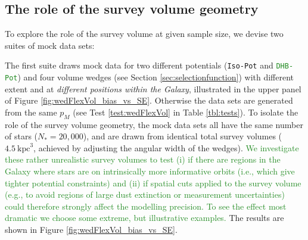 \documentclass[iop,revtex4]{emulateapj}
\newcommand{\pmodel}{\ensuremath{p_M}}
\newcommand{\NEW}[1]{\textcolor{ForestGreen}{#1}}
\newcommand{\OLD}[1]{}
\begin{document}
\subsection{The role of the survey volume geometry} \label{sec:results_obsvolume}

To explore the role of the survey volume at given sample size, we devise two suites of mock data sets: 

The first suite draws mock data for two different potentials (\texttt{Iso-Pot} and \OLD{\texttt{MW13-Pot}}\NEW{\texttt{DHB-Pot}}) and four volume wedges (see Section \ref{sec:selectionfunction}) with different extent and at {\it different positions within the Galaxy}, illustrated in the upper panel of Figure \ref{fig:wedFlexVol_bias_vs_SE}. Otherwise the data sets are generated from the same \pmodel{} (see Test \ref{test:wedFlexVol} in Table \ref{tbl:tests}). To isolate the role of the survey volume geometry, the mock data sets all have the same number of stars ($N_{*} = 20,000$)\OLD{in all cases}, and are drawn from identical total survey volumes ($4.5~\text{kpc}^3$, achieved by adjusting the angular width of the wedges).
\NEW{We investigate these rather unrealistic survey volumes to test (i) if there are regions in the Galaxy where stars are on intrinsically more informative orbits (i.e., which give tighter potential constraints) and (ii) if spatial cuts applied to the survey volume (e.g., to avoid regions of large dust extinction or measurement uncertainties) could therefore strongly affect the modelling precision. To see the effect most dramatic we choose some extreme, but illustrative examples.}
The results are shown in Figure \ref{fig:wedFlexVol_bias_vs_SE}.
\end{document}

